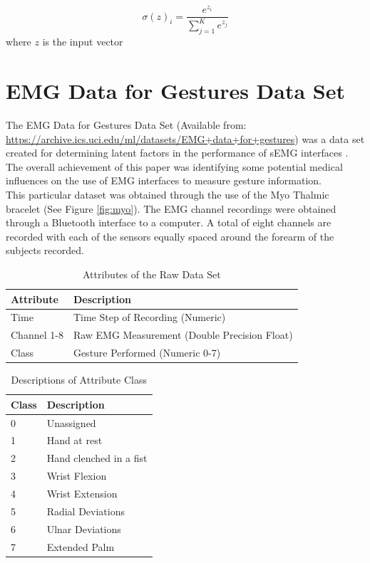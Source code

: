 \documentclass[11pt]{article}
\begin{document}
	$$\sigma(z)_i= \frac{e^{z_i}}{\sum_{j=1}^{K}e^{z_j}}$$ where $z$ is the input vector
	
	
	\section{EMG Data for Gestures Data Set}
	The EMG Data for Gestures Data Set (Available from: \url{https://archive.ics.uci.edu/ml/datasets/EMG+data+for+gestures}) was a data set created for determining latent factors in the performance of sEMG interfaces \cite{Lobov2018}. The overall achievement of this paper was identifying some potential medical influences on the use of EMG interfaces to measure gesture information.\\
	
	\noindent
	This particular dataset was obtained through the use of the Myo Thalmic bracelet (See Figure \ref{fig:myo}). The EMG channel recordings were obtained through a Bluetooth interface to a computer. A total of eight channels are recorded with each of the sensors equally spaced around the forearm of the subjects recorded.\\
	
	\begin{table}[H]
		\caption{Attributes of the Raw Data Set}
		\centering
		\begin{tabular}{l|l}
			Attribute   & Description             \\\hline
			Time        & Time Step of  Recording (Numeric)\\
			Channel 1-8 & Raw EMG Measurement (Double Precision Float)     \\
			Class       & Gesture Performed (Numeric 0-7)      \\\hline\hline
		\end{tabular}
	\end{table}

\begin{table}[H]
	\caption{Descriptions of Attribute Class}
	\centering
	\begin{tabular}{l|l}
		Class & Description             \\\hline
		0     & Unassigned              \\
		1     & Hand at rest            \\
		2     & Hand clenched in a fist \\
		3     & Wrist Flexion           \\
		4     & Wrist Extension         \\
		5     & Radial Deviations       \\
		6     & Ulnar Deviations        \\
		7     & Extended Palm           \\\hline\hline
	\end{tabular}
\end{table}
	
\end{document}
